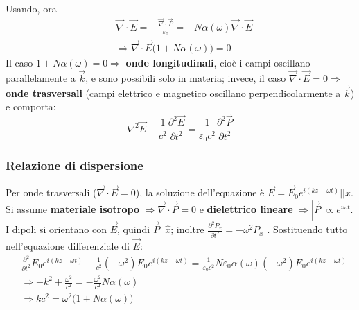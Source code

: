 \documentclass[a4paper]{scrartcl}
\numberwithin{equation}{subsection}
\theoremstyle{style1}
\begin{document}
Usando, ora
\begin{equation}
	\begin{split}
		&\vec{\nabla }\cdot \vec{E} = - \frac{\vec{\nabla }\cdot \vec{P}}{\varepsilon _0}= - N\alpha (\omega) \vec{\nabla }\cdot \vec{E}\\
		&\Rightarrow \vec{\nabla }\cdot \vec{E}\big(1+ N\alpha (\omega)\big) = 0
	\end{split}
\end{equation}
Il caso $1+N\alpha (\omega) = 0\Rightarrow $ \textbf{onde longitudinali}, cio\`e i campi oscillano parallelamente a $\vec{k}$, e sono possibili solo in materia; invece, il caso $\vec{\nabla }\cdot \vec{E}= 0\Rightarrow $ \textbf{onde trasversali} (campi elettrico e magnetico oscillano perpendicolarmente a $\vec{k}$) e comporta:
\begin{equation}
	\nabla ^2 \vec{E}-\frac{1}{c^2}\frac{\partial ^2 \vec{E}}{\partial t^2} = \frac{1}{\varepsilon _0 c^2} \frac{\partial ^2 \vec{P}}{\partial t^2} 
\end{equation}
\subsubsection{Relazione di dispersione}
Per onde trasversali ($\vec{\nabla }\cdot \vec{E}=0$), la soluzione dell'equazione \`e $\vec{E}= \vec{E}_0 e^{i(kz-\omega t)} | | \hat{x} $. Si assume \textbf{materiale isotropo} $\Rightarrow \vec{\nabla }\cdot \vec{P}=0$ e \textbf{dielettrico lineare} $\Rightarrow \left\lvert \vec{P} \right\rvert \propto e^{i\omega t} $. I dipoli si orientano con $\vec{E}$, quindi $\vec{P}| | \hat{x}$; inoltre $\frac{\partial ^2 P_x}{\partial t^2} =-\omega^2 P_x$ . Sostituendo tutto nell'equazione differenziale di $\vec{E}$:
\begin{equation}
	\begin{split}
		&\frac{\partial ^2}{\partial t^2} E_0e^{i(kz-\omega t)} - \frac{1}{c^2}(-\omega^2) E_0 e^{i(kz-\omega t)}=\frac{1}{\varepsilon _0 c^2}N\varepsilon _0 \alpha (\omega) (-\omega^2) E_0e^{i(kz-\omega t)}  \\
		&\Rightarrow -k^2 + \frac{\omega^2}{c^2} = - \frac{\omega^2}{c^2} N\alpha (\omega) \\
		&\Rightarrow kc^2 = \omega^2 \big(1+N\alpha (\omega)\big)
	\end{split}
\end{equation}
\end{document}
